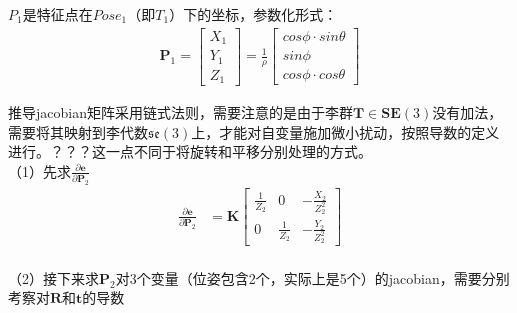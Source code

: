 \documentclass{article}
\begin{document}
$P_1$是特征点在$Pose_1$（即$T_1$）下的坐标，参数化形式：
\begin{equation}
	\begin{aligned}
		\boldsymbol{P}_1=       
		\left[                  
		\begin{matrix}          
		X_1                     \\
		Y_1                     \\
		Z_1                     
		\end{matrix}            
		\right]                 
		=\frac{1}{\rho}         
		\left[                  
		\begin{matrix}          
		cos\phi \cdot sin\theta \\
		sin\phi                 \\
		cos\phi \cdot cos\theta 
		\end{matrix}            
		\right]                 
	\end{aligned}
\end{equation}

推导jacobian矩阵采用链式法则，需要注意的是由于李群$\boldsymbol{T}\in \boldsymbol{SE}(3)$没有加法，需要将其映射到李代数$\mathfrak{se}(3)$上，才能对自变量施加微小扰动，按照导数的定义进行。？？？这一点不同于将旋转和平移分别处理的方式。\\
（1）先求$\frac {\partial{\boldsymbol{e}}}{\partial{\boldsymbol{P}_2}}$
\begin{equation}
	\begin{aligned}
		\frac {\partial{\boldsymbol{e}}}{\partial{\boldsymbol{P}_2}}&=\boldsymbol K 
		\left[
		\begin{matrix}
		\frac{1}{Z_2} & 0             & -\frac{X_2}{Z_2^2} \\
		0             & \frac{1}{Z_2} & -\frac{Y_2}{Z_2^2} 
		\end{matrix}
		\right] 
	\end{aligned}
\end{equation} \\
（2）接下来求$\boldsymbol{P}_2$对3个变量（位姿包含2个，实际上是5个）的jacobian，需要分别考察对$\boldsymbol{R}$和$\boldsymbol t$的导数
\end{document}
